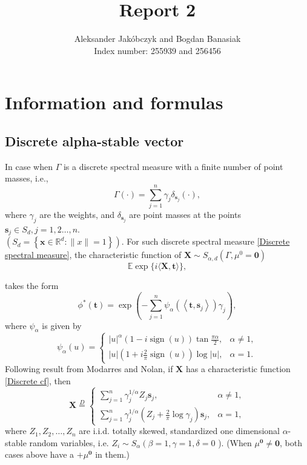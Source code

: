 \documentclass{article}
\title{Report 2}
\author{Aleksander Jakóbczyk and Bogdan Banasiak\\ 
	Index number: 255939 and 256456}
\date{}\date{}
\begin{document}
	\maketitle
	\section{Information and formulas}
	
	
	\subsection{Discrete alpha-stable vector}
	In case when $\Gamma$ is a discrete spectral measure with a finite number of point masses, i.e.,
	\begin{equation}\label{Discrete spectral measure}
		\Gamma(\cdot)=\sum_{j=1}^n \gamma_j \delta_{\mathbf{s}_j}(\cdot),
	\end{equation}
	where $\gamma_j$ are the weights, and $\delta_{\mathbf{s}_j}$ are point masses at the points $\mathbf{s}_j \in S_d, j=1,2 \ldots, n$. \\$\left(S_d=\left\{\mathbf{x} \in \mathbb{R}^d:\|x\|=1\right\}\right)$.
	For such discrete spectral measure \eqref{Discrete spectral measure}, the characteristic function of $\mathbf{X} \sim S_{\alpha, d}\left(\Gamma, \mu^0=\mathbf{0}\right)$
	\begin{equation*}
		\mathbb{E} \exp \{i\langle\mathbf{X}, \mathbf{t}\rangle\},
	\end{equation*}

	takes the form
	\begin{equation}\label{Discrete cf}
		\phi^*(\mathbf{t})=\exp \left(-\sum_{j=1}^n \psi_\alpha\left(\left\langle\mathbf{t}, \mathbf{s}_j\right\rangle\right) \gamma_j\right),
	\end{equation}
	where $\psi_\alpha$ is given by
	$$
	\psi_\alpha(u)= \begin{cases}|u|^\alpha(1-i \operatorname{sign}(u)) \tan \frac{\pi \alpha}{2}, & \alpha \neq 1, \\ |u|\left(1+i \frac{2}{\pi} \operatorname{sign}(u)\right) \log |u|, & \alpha=1 .\end{cases}
	$$
	Following result from Modarres and Nolan, if $\mathbf{X}$ has a characteristic function \eqref{Discrete cf}, then
	$$
	\mathbf{X} \stackrel{D}{=} \begin{cases}\sum_{j=1}^n \gamma_j^{1 / \alpha} Z_j \mathbf{s}_j, & \alpha \neq 1, \\ \sum_{j=1}^n \gamma_j^{1 / \alpha}\left(Z_j+\frac{2}{\pi} \log \gamma_j\right) \mathbf{s}_j, & \alpha=1,\end{cases}
	$$
	where $Z_1, Z_2, \ldots, Z_n$ are i.i.d. totally skewed, standardized one dimensional $\alpha$-stable random variables, i.e. $Z_i \sim S_\alpha\left(\beta=1, \gamma=1, \delta=0\right.$ ). (When $\mu^{\mathbf{0}} \neq \mathbf{0}$, both cases above have a $+\mu^{\mathbf{0}}$ in them.)
	
\end{document}
